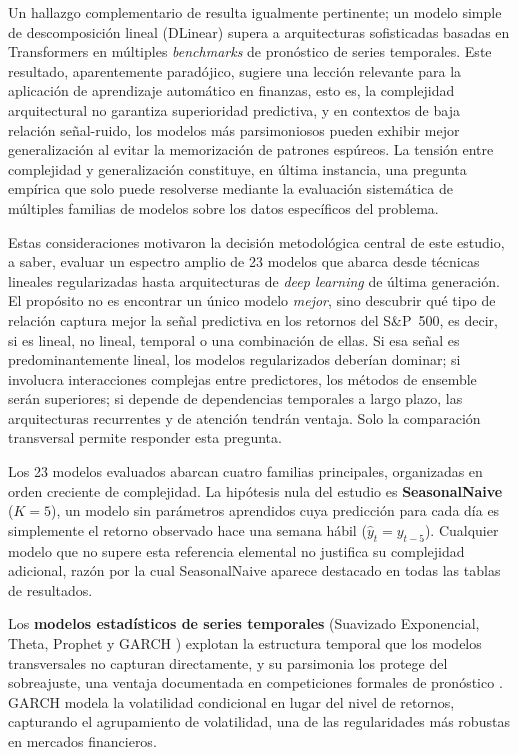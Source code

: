 ﻿\documentclass[11pt,a4paper]{article}
\begin{document}
Un hallazgo complementario de \citet{zeng2023} resulta igualmente pertinente; un modelo simple de descomposici\'on lineal (DLinear) supera a arquitecturas sofisticadas basadas en Transformers en m\'ultiples \textit{benchmarks} de pron\'ostico de series temporales. Este resultado, aparentemente parad\'ojico, sugiere una lecci\'on relevante para la aplicaci\'on de aprendizaje autom\'atico en finanzas, esto es, la complejidad arquitectural no garantiza superioridad predictiva, y en contextos de baja relaci\'on se\~nal-ruido, los modelos m\'as parsimoniosos pueden exhibir mejor generalizaci\'on al evitar la memorizaci\'on de patrones esp\'ureos. La tensi\'on entre complejidad y generalizaci\'on constituye, en \'ultima instancia, una pregunta emp\'irica que solo puede resolverse mediante la evaluaci\'on sistem\'atica de m\'ultiples familias de modelos sobre los datos espec\'ificos del problema.

Estas consideraciones motivaron la decisi\'on metodol\'ogica central de este estudio, a saber, evaluar un espectro amplio de 23 modelos que abarca desde t\'ecnicas lineales regularizadas hasta arquitecturas de \textit{deep learning} de \'ultima generaci\'on. El prop\'osito no es encontrar un \'unico modelo \textit{mejor}, sino descubrir qu\'e tipo de relaci\'on captura mejor la se\~nal predictiva en los retornos del S\&P~500, es decir, si es lineal, no lineal, temporal o una combinaci\'on de ellas. Si esa se\~nal es predominantemente lineal, los modelos regularizados deber\'ian dominar; si involucra interacciones complejas entre predictores, los m\'etodos de ensemble ser\'an superiores; si depende de dependencias temporales a largo plazo, las arquitecturas recurrentes y de atenci\'on tendr\'an ventaja. Solo la comparaci\'on transversal permite responder esta pregunta.

Los 23 modelos evaluados abarcan cuatro familias principales, organizadas en orden creciente de complejidad. La hip\'otesis nula del estudio es \textbf{SeasonalNaive} ($K{=}5$), un modelo sin par\'ametros aprendidos cuya predicci\'on para cada d\'ia es simplemente el retorno observado hace una semana h\'abil ($\hat{y}_t = y_{t-5}$). Cualquier modelo que no supere esta referencia elemental no justifica su complejidad adicional, raz\'on por la cual SeasonalNaive aparece destacado en todas las tablas de resultados.

Los \textbf{modelos estad\'isticos de series temporales} (Suavizado Exponencial, Theta, Prophet \citep{taylor2018} y GARCH \citep{bollerslev1986}) explotan la estructura temporal que los modelos transversales no capturan directamente, y su parsimonia los protege del sobreajuste, una ventaja documentada en competiciones formales de pron\'ostico \citep{makridakis2018}. GARCH modela la volatilidad condicional en lugar del nivel de retornos, capturando el agrupamiento de volatilidad, una de las regularidades m\'as robustas en mercados financieros.
\end{document}
